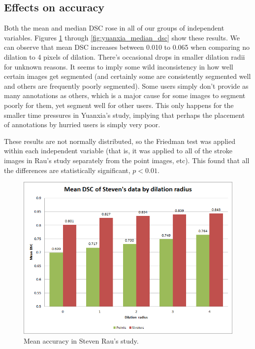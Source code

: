 \documentclass[12pt,a4paper,notitlepage]{article}
\begin{document}
\subsection{Effects on accuracy}
Both the mean and median DSC rose in all of our groups of independent variables. Figures \ref{fig:steven_mean_dsc} through \ref{fig:yuanxia_median_dsc} show these results. We can observe that mean DSC increases between 0.010 to 0.065 when comparing no dilation to 4 pixels of dilation. There's occasional drops in smaller dilation radii for unknown reasons. It seems to imply some wild inconsistency in how well certain images get segmented (and certainly some are consistently segmented well and others are frequently poorly segmented). Some users simply don't provide as many annotations as others, which is a major cause for some images to segment poorly for them, yet segment well for other users. This only happens for the smaller time pressures in Yuanxia's study, implying that perhaps the placement of annotations by hurried users is simply very poor.

These results are not normally distributed, so the Friedman test was applied within each independent variable (that is, it was applied to all of the stroke images in Rau's study separately from the point images, etc). This found that all the differences are statistically significant, $p < 0.01$.

\begin{figure}[H]
	\includegraphics[width=.9\linewidth]{steven_mean_dsc}
	\caption{Mean accuracy in Steven Rau's study.}
	\label{fig:steven_mean_dsc}
\end{figure}
\end{document}
